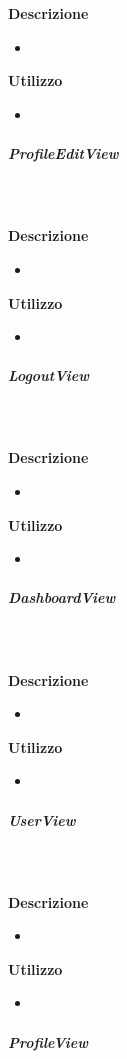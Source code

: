 				\textbf{\\ \\ Descrizione} 
					\begin{itemize}
						\item[] 
					\end{itemize}      
				\textbf{Utilizzo}  
					\begin{itemize}
						\item[] 
					\end{itemize}
			\subparagraph{ProfileEditView}
				
				\textbf{\\ \\ Descrizione} 
					\begin{itemize}
						\item[] 
					\end{itemize}      
				\textbf{Utilizzo}  
					\begin{itemize}
						\item[] 
					\end{itemize}
			\subparagraph{LogoutView}
				
				\textbf{\\ \\ Descrizione} 
					\begin{itemize}
						\item[] 
					\end{itemize}      
				\textbf{Utilizzo}  
					\begin{itemize}
						\item[] 
					\end{itemize}
			\subparagraph{DashboardView}
				
				\textbf{\\ \\ Descrizione} 
					\begin{itemize}
						\item[] 
					\end{itemize}      
				\textbf{Utilizzo}  
					\begin{itemize}
						\item[] 
					\end{itemize}
			\subparagraph{UserView}
				
				\textbf{\\ \\ Descrizione} 
					\begin{itemize}
						\item[] 
					\end{itemize}      
				\textbf{Utilizzo}  
					\begin{itemize}
						\item[] 
					\end{itemize}
			\subparagraph{ProfileView}
				
